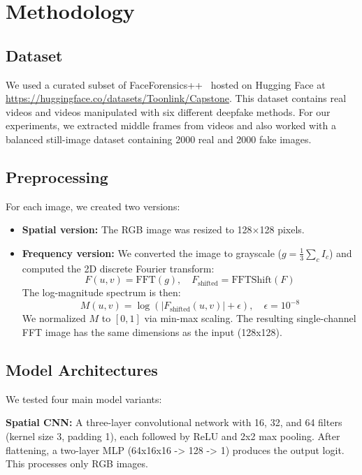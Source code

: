 \documentclass{article}
\begin{document}
\section{Methodology}

\subsection{Dataset}

We used a curated subset of FaceForensics++~\cite{rossler2019faceforensics} hosted on Hugging Face at \url{https://huggingface.co/datasets/Toonlink/Capstone}. This dataset contains real videos and videos manipulated with six different deepfake methods. For our experiments, we extracted middle frames from videos and also worked with a balanced still-image dataset containing 2000 real and 2000 fake images.

\subsection{Preprocessing}

For each image, we created two versions:
\begin{itemize}
  \item \textbf{Spatial version:} The RGB image was resized to 128$\times$128 pixels.
  \item \textbf{Frequency version:} We converted the image to grayscale ($g = \frac{1}{3}\sum_c I_c$) and computed the 2D discrete Fourier transform:
\begin{equation}
F(u,v) = \text{FFT}(g), \quad F_{\text{shifted}} = \text{FFTShift}(F)
\end{equation}
The log-magnitude spectrum is then:
\begin{equation}
M(u,v) = \log\left(|F_{\text{shifted}}(u,v)| + \epsilon\right), \quad \epsilon = 10^{-8}
\end{equation}
We normalized $M$ to $[0,1]$ via min-max scaling. The resulting single-channel FFT image has the same dimensions as the input (128x128).
\end{itemize}

\subsection{Model Architectures}

We tested four main model variants:

\textbf{Spatial CNN:} A three-layer convolutional network with 16, 32, and 64 filters (kernel size 3, padding 1), each followed by ReLU and 2x2 max pooling. After flattening, a two-layer MLP (64x16x16 -> 128 -> 1) produces the output logit. This processes only RGB images.
\end{document}
